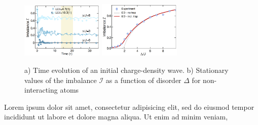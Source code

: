 \begin{figure}[h]
    \centering
    \includegraphics[align=c, width=0.35\textwidth]{imgs/MBL_exp_1.png}
    \hspace{10 mm} 
    \includegraphics[align=c, width=0.35\textwidth]{imgs/MBL_exp_2.png}
    \caption{a) Time evolution of an initial charge-density wave. b) Stationary values of the imbalance $\mathcal{I}$ as a function of disorder $\Delta$ for non-interacting atoms }
\end{figure}



\newpage




Lorem ipsum dolor sit amet, consectetur adipisicing elit, sed do eiusmod
tempor incididunt ut labore et dolore magna aliqua. Ut enim ad minim veniam,

